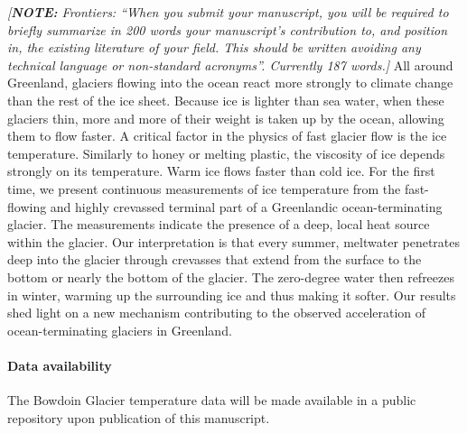 \documentclass[utf8]{article}
\newcommand{\note}[1]{\textcolor{c0}{\emph{[\textbf{NOTE:} #1]}}}
\begin{document}
    \note{Frontiers: ``When you submit your manuscript, you will be required to
          briefly summarize in 200 words your manuscript’s contribution to, and
          position in, the existing literature of your field. This should be
          written avoiding any technical language or non-standard acronyms''.
          Currently 187 words.}
    All around Greenland, glaciers flowing into the ocean react more strongly
    to climate change than the rest of the ice sheet. Because ice is lighter
    than sea water, when these glaciers thin, more and more of their weight is
    taken up by the ocean, allowing them to flow faster. A critical factor in
    the physics of fast glacier flow is the ice temperature. Similarly to honey
    or melting plastic, the viscosity of ice depends strongly on its
    temperature. Warm ice flows faster than cold ice.
    For the first time, we present continuous measurements of ice
    temperature from the fast-flowing and highly crevassed terminal part of a
    Greenlandic ocean-terminating glacier. The measurements indicate the
    presence of a deep, local heat source within the glacier. Our
    interpretation is that every summer, meltwater penetrates deep into the
    glacier through crevasses that extend from the surface to the bottom or
    nearly the bottom of the glacier. The zero-degree water then refreezes in
    winter, warming up the surrounding ice and thus making it softer.
    Our results shed light on a new mechanism contributing to the observed
    acceleration of ocean-terminating glaciers in Greenland.

\paragraph{Data availability}

    The Bowdoin Glacier temperature data will be made available in a public
    repository upon publication of this manuscript.







\clearpage
\end{document}
